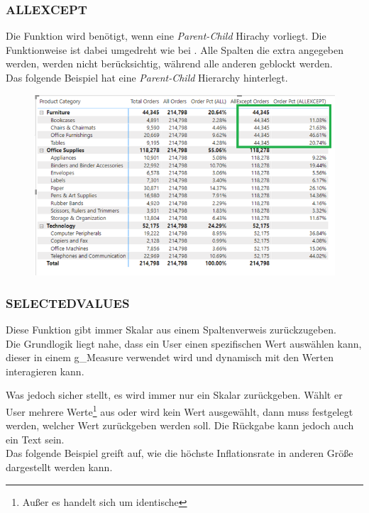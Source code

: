 \subsubsection{ALLEXCEPT}
Die Funktion wird benötigt, wenn eine \textit{Parent-Child} Hirachy vorliegt. Die Funktionweise ist dabei umgedreht wie bei . Alle Spalten die extra angegeben werden, werden nicht berücksichtig, während alle anderen geblockt werden.\\

Das folgende Beispiel hat eine \textit{Parent-Child} Hierarchy hinterlegt.

\begin{figure}[H]
	\centering
	\includegraphics[scale = 0.3]{attachment/chapter_1/Scc157}
\end{figure}

\subsubsection{SELECTEDVALUES}
Diese Funktion gibt immer Skalar aus einem Spaltenverweis zurückzugeben. \\

Die Grundlogik liegt nahe, dass ein User einen spezifischen Wert auswählen kann, dieser in einem \gls{g_Measure} verwendet wird und dynamisch mit den Werten interagieren kann.

Was  jedoch sicher stellt, es wird immer nur ein Skalar zurückgeben. Wählt er User mehrere Werte\footnote{Außer es handelt sich um identische} aus oder wird kein Wert ausgewählt, dann muss festgelegt werden, welcher Wert zurückgeben werden soll. Die Rückgabe kann jedoch auch ein Text sein.\\

Das folgende Beispiel greift auf, wie die höchste Inflationsrate in anderen Größe dargestellt werden kann.

